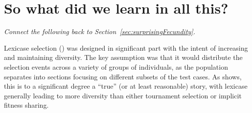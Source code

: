 
\section{So what did we learn in all this?}
\label{sec:whatDidWeLearn}

\emph{Connect the following back to Section~\ref{sec:surprisingFecundity}.}

Lexicase selection (\cite{helmuth:IEEE}) was designed in significant part with the intent of 
increasing and maintaining diversity. The key assumption was that it would distribute the selection 
events across a variety of groups of individuals, as the population separates into sections focusing
on different subsets of the test cases. As \cite{helmuth:GPTP15} shows, this is to a significant
degree a ``true'' (or at least reasonable) story, with lexicase generally leading to more diversity
than either tournament selection or implicit fitness sharing.

